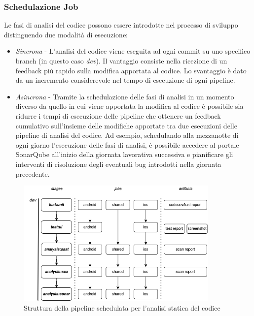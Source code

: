 \subsubsection{Schedulazione Job}
Le fasi di analisi del codice possono essere introdotte nel processo di sviluppo distinguendo due modalità di esecuzione:
\begin{itemize}
    \item \textit{Sincrona} - L'analisi del codice viene eseguita ad ogni commit su uno specifico branch (in questo caso \textit{dev}). Il vantaggio consiste nella ricezione di un feedback più rapido sulla modifica apportata al codice. Lo svantaggio è dato da un incremento considerevole nel tempo di esecuzione di ogni pipeline.
    \item \textit{Asincrona} - Tramite la schedulazione delle fasi di analisi in un momento diverso da quello in cui viene apportata la modifica al codice è possibile sia ridurre i tempi di esecuzione delle pipeline che ottenere un feedback cumulativo sull'insieme delle modifiche apportate tra due esecuzioni delle pipeline di analisi del codice. Ad esempio, schedulando alla mezzanotte di ogni giorno l'esecuzione delle fasi di analisi, è possibile accedere al portale SonarQube all'inizio della giornata lavorativa successiva e pianificare gli interventi di risoluzione degli eventuali bug introdotti nella giornata precedente.
\end{itemize}

\begin{figure}[H]
\centering
\includegraphics[width=0.88\textwidth]{img/tesi-16-cicd-scheduled.drawio.png}
\caption{Struttura della pipeline schedulata per l'analisi statica del codice}
\end{figure}

